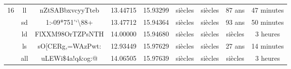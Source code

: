 \begin{table}[H]
{\begin{tabular}{lcccccccc}
			\multirow{5}{*}{16}                               & ll                           & nZtSABbxvcyyTteb                                & 13.44715                                                                          & 15.93299                                                                                       & siècles                                                            & siècles                                                              & 87 ans                                                               & 47 minutes                                                           \\ \cline{2-9} 
			& sd                           & 1:-09*751'`\textbackslash88+\texttildelow                            & 13.47712                                                                            & 15.94364                                                                                      & siècles                                                            & siècles                                                              & 93 ans                                                                & 50 minutes                                                            \\ \cline{2-9} 
			& ld                           & FlXXM98OrTZPsNTH                                & 14.00000                                                                           & 15.94680                                                                                       & siècles                                                            & siècles                                                              & siècles                                                              & 3 heures                                                           \\ \cline{2-9} 
			& ls                           & sO[CERg,=WAzPwt:             & 12.93449                                                                          & 15.97629                                                                                     & siècles                                                            & siècles                                                              & 27 ans                                                               & 14 minutes                                                           \\ \cline{2-9} 
			& all                          &      uLEWi\$4\textbraceright a!q\&og:@                          & 14.06505                                                                            & 15.97639                                                                                        & siècles                                                            & siècles                                                              & siècles                                                               & 3 heures                                                           \\ \hline\midrule

\end{tabular}}
\end{table}
